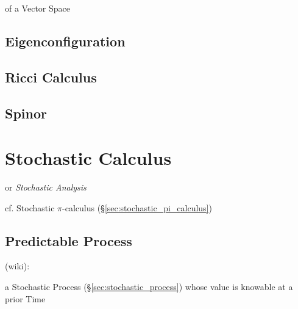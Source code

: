 of a Vector Space



\subsection{Eigenconfiguration}\label{sec:eigenconfiguration}

\subsection{Ricci Calculus}\label{sec:ricci_calculus}

\subsection{Spinor}\label{sec:spinor}



\section{Stochastic Calculus}\label{sec:stochastic_calculus}

or \emph{Stochastic Analysis}


cf. Stochastic $\pi$-calculus (\S\ref{sec:stochastic_pi_calculus})



\subsection{Predictable Process}\label{sec:predictable_process}

(wiki):

a Stochastic Process (\S\ref{sec:stochastic_process}) whose value is knowable at
a prior Time

